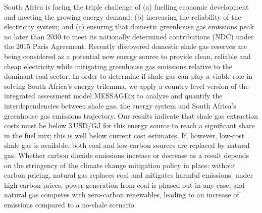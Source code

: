 South Africa is facing the triple challenge of (a) fuelling economic development and meeting the growing energy demand; (b) increasing the reliability of the electricity system; and (c) ensuring that domestic greenhouse gas emissions peak no later than 2030 to meet its nationally determined contributions (NDC) under the 2015 Paris Agreement. Recently discovered domestic shale gas reserves are being considered as a potential new energy source to provide clean, reliable and cheap electricity while mitigating greenhouse gas emissions relative to the dominant coal sector. In order to determine if shale gas can play a viable role in solving South Africa's energy trilemma, we apply a country-level version of the integrated assessment model MESSAGEix to analyze and quantify the interdependencies between shale gas, the energy system and South Africa's greenhouse gas emissions trajectory. Our results indicate that shale gas extraction costs must be below 3\,USD/GJ for this energy source to reach a significant share in the fuel mix; this is well below current cost estimates. If, however, low-cost shale gas is available, both coal and low-carbon sources are replaced by natural gas. Whether carbon dioxide emissions increase or decrease as a result depends on the stringency of the climate change mitigation policy in place: without carbon pricing, natural gas replaces coal and mitigates harmful emissions; under high carbon prices, power generation from coal is phased out in any case, and natural gas competes with zero-carbon renewables, leading to an increase of emissions compared to a no-shale scenario.